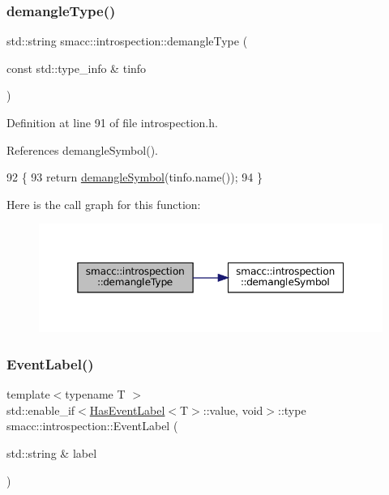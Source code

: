 \subsubsection{\texorpdfstring{demangle\+Type()}{demangleType()}\hspace{0.1cm}{\footnotesize\ttfamily [2/2]}}
{\footnotesize\ttfamily std\+::string smacc\+::introspection\+::demangle\+Type (\begin{DoxyParamCaption}\item[{const std\+::type\+\_\+info \&}]{tinfo }\end{DoxyParamCaption})\hspace{0.3cm}{\ttfamily [inline]}}



Definition at line 91 of file introspection.\+h.



References demangle\+Symbol().


\begin{DoxyCode}
92 \{
93     \textcolor{keywordflow}{return} \hyperlink{namespacesmacc_1_1introspection_aa9158a0ff0cfe83a59877e6af7d7f873}{demangleSymbol}(tinfo.name());
94 \}
\end{DoxyCode}
Here is the call graph for this function\+:
\nopagebreak
\begin{figure}[H]
\begin{center}
\leavevmode
\includegraphics[width=350pt]{namespacesmacc_1_1introspection_a81ad2fc77a0262640d4b1bd273938603_cgraph}
\end{center}
\end{figure}
\mbox{\label{namespacesmacc_1_1introspection_a7d5ea10a24373bf452d3b6987d0a6bd0}} 
\subsubsection{\texorpdfstring{Event\+Label()}{EventLabel()}\hspace{0.1cm}{\footnotesize\ttfamily [1/2]}}
{\footnotesize\ttfamily template$<$typename T $>$ \\
std\+::enable\+\_\+if$<$\hyperlink{classsmacc_1_1introspection_1_1HasEventLabel}{Has\+Event\+Label}$<$T$>$\+::value, void$>$\+::type smacc\+::introspection\+::\+Event\+Label (\begin{DoxyParamCaption}\item[{std\+::string \&}]{label }\end{DoxyParamCaption})}



